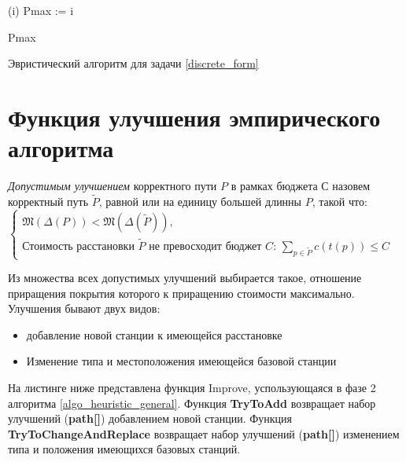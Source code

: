 \begin{algorithm}
{ 	
 	\tcp*[h]{\textcolor{commentcolor}{Phase 2 and 3}}
 	
 	 {
 		\Improve(i)\;
 		 {
 			Pmax := i\;
 		}
 	}
 	
 	\KwRet Pmax\;
 }
 \caption{Эвристический алгоритм для задачи \ref{discrete_form}}\label{algo_heuristic_general}
\end{algorithm}

\clearpage

\section{Функция улучшения эмпирического алгоритма} \label{iprove_function}

\begin{mydef}
	\textit{Допустимым улучшением} корректного пути $P$ в рамках бюджета $С$ назовем корректный путь $\tilde{P}$, равной или на единицу большей длинны $P$, такой что:
	$
	\begin{cases}
	\mathfrak{M}(\Delta(P)) < \mathfrak{M}(\Delta(\tilde{P})),\\
	\text{Стоимость расстановки $\tilde{P}$ не превосходит бюджет $C$: $\sum\limits_{p \in \tilde{P}}c(t(p)) \le C$}
	\end{cases}
	$
\end{mydef}

Из множества всех допустимых улучшений выбирается такое, отношение приращения покрытия которого к приращению стоимости максимально. Улучшения бывают двух видов:
\begin{itemize}
	\item добавление новой станции к имеющейся расстановке
	\item Изменение типа и местоположения имеющейся базовой станции
\end{itemize}

На листинге ниже представлена функция Improve, успользующаяся в фазе 2 алгоритма \ref{algo_heuristic_general}. Функция \textbf{TryToAdd} возвращает набор улучшений (\textbf{path[]}) добавлением новой станции.
Функция \textbf{TryToChangeAndReplace} возвращает набор улучшений (\textbf{path[]}) изменением типа и положения имеющихся базовых станций.

